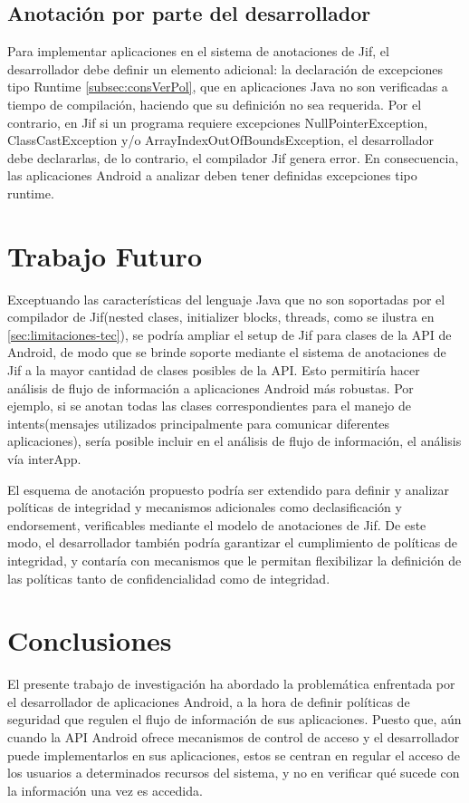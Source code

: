 \subsection{Anotación por parte del desarrollador}
\label{subsec:cambios}
Para implementar aplicaciones en el sistema de anotaciones de Jif, el
desarrollador debe definir un elemento adicional: la declaración de
excepciones tipo Runtime \ref{subsec:consVerPol}, que en aplicaciones Java no
son verificadas a tiempo de compilación, haciendo que su definición no sea requerida. 
Por el contrario, en Jif si un programa requiere excepciones
NullPointerException, ClassCastException y/o ArrayIndexOutOfBoundsException, el
desarrollador debe declararlas, de lo contrario, el compilador Jif genera
error.
En consecuencia, las aplicaciones Android a analizar deben tener definidas
excepciones tipo runtime.

\section{Trabajo Futuro}

Exceptuando las características del lenguaje Java que no son soportadas por el
compilador de Jif(nested clases, initializer blocks, threads, como se ilustra en
 \ref{sec:limitaciones-tec}), se podría ampliar el setup de Jif para clases de
 la API de Android, de modo que se brinde soporte mediante el sistema de anotaciones de
Jif a la mayor cantidad de clases posibles de la API.
Esto permitiría hacer análisis de flujo de información a aplicaciones
Android más robustas. Por ejemplo, si se anotan todas las clases
correspondientes para el manejo de intents(mensajes utilizados principalmente
para comunicar diferentes aplicaciones), sería posible incluir en el análisis de
flujo de información, el análisis vía interApp. 

El esquema de anotación propuesto podría ser
extendido para definir y analizar políticas de integridad y mecanismos
adicionales como declasificación y endorsement, verificables mediante el modelo
de anotaciones de Jif. De este modo, el desarrollador también podría garantizar
el cumplimiento de políticas de integridad, y contaría con mecanismos que le
permitan flexibilizar la definición de las políticas tanto de confidencialidad
como de integridad.

\section{Conclusiones}
El presente trabajo de investigación ha abordado la problemática enfrentada por
el desarrollador de aplicaciones Android, a la hora de definir políticas de
seguridad que regulen el flujo de información de sus aplicaciones. Puesto que,
aún cuando la API Android ofrece mecanismos de control de acceso y el
desarrollador puede implementarlos en sus aplicaciones, estos se centran en
regular el acceso de los usuarios a determinados recursos del sistema, y no en
verificar qué sucede con la información una vez es accedida.

